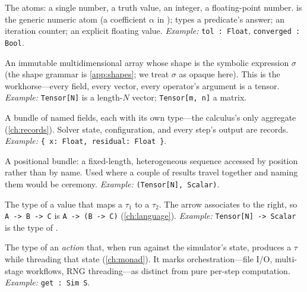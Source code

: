 \begin{description}[style=nextline, leftmargin=1.4em, font=\normalfont\itshape]
  \item[Ground scalars \code{Scalar}, \code{Bool}, \code{Int}, \code{Float}.] The
  atoms: a single number, a truth value, an integer, a floating-point number.
   is the generic numeric atom (a coefficient $\alpha$ in
  );  types a predicate's answer;  an iteration
  counter;  an explicit floating value. \emph{Example:}
  \lstinline[style=l4style]|tol : Float|, \lstinline[style=l4style]|converged : Bool|.
  \item[Tensors \code{Tensor[$\sigma$]}.] An immutable multidimensional array
  whose shape is the symbolic expression $\sigma$ (the shape grammar is
  \cref{app:shapes}; we treat $\sigma$ as opaque here). This is the
  workhorse---every field, every vector, every operator's argument is a tensor.
  \emph{Example:} \lstinline[style=l4style]|Tensor[N]| is a length-$N$ vector;
  \lstinline[style=l4style]|Tensor[m, n]| a matrix.
  \item[Records \code{\{$l_1$: $\tau_1$, \dots, $l_n$: $\tau_n$\}}.] A bundle of
  named fields, each with its own type---the calculus's only aggregate
  (\cref{ch:records}). Solver state, configuration, and every step's output are
  records. \emph{Example:}
  \lstinline[style=l4style]|{ x: Float, residual: Float }|.
  \item[Tuples \code{$\tau_1 \times \cdots \times \tau_n$}.] A positional bundle:
  a fixed-length, heterogeneous sequence accessed by position rather than by
  name. Used where a couple of results travel together and naming them would be
  ceremony. \emph{Example:} \lstinline[style=l4style]|(Tensor[N], Scalar)|.
  \item[Functions \code{$\tau_1 \to \tau_2$}.] The type of a value that maps a
  $\tau_1$ to a $\tau_2$. The arrow associates to the right, so
  \lstinline[style=l4style]|A -> B -> C| is \lstinline[style=l4style]|A -> (B -> C)|
  (\cref{ch:language}). \emph{Example:}
  \lstinline[style=l4style]|Tensor[N] -> Scalar| is the type of .
  \item[The simulator monad \code{Sim $\tau$}.] The type of an \emph{action} that,
  when run against the simulator's state, produces a $\tau$ while threading that
  state (\cref{ch:monad}). It marks orchestration---file I/O, multi-stage
  workflows, RNG threading---as distinct from pure per-step computation.
  \emph{Example:} \lstinline[style=l4style]|get : Sim S|.

\end{description}
